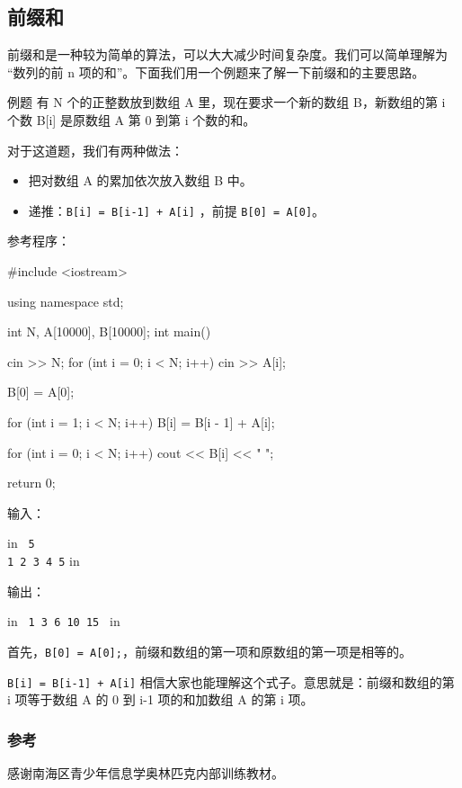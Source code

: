 
\subsection{前缀和}

前缀和是一种较为简单的算法，可以大大减少时间复杂度。我们可以简单理解为 “数列的前 n 项的和”。下面我们用一个例题来了解一下前缀和的主要思路。

\begin{NOTE}{例题}{}
有 N 个的正整数放到数组 A 里，现在要求一个新的数组 B，新数组的第 i 个数 B[i] 是原数组 A 第 0 到第 i 个数的和。
\end{NOTE}


对于这道题，我们有两种做法：

\begin{itemize}
\item 把对数组 A 的累加依次放入数组 B 中。
\item 递推：\texttt{B[i] = B[i-1] + A[i]} ，前提 \texttt{B[0] = A[0]}。
\end{itemize}

参考程序：

\begin{cppcode}
#include <iostream>

using namespace std;

int N, A[10000], B[10000];
int main() {
  cin >> N;
  for (int i = 0; i < N; i++) {
    cin >> A[i];
  }

  B[0] = A[0];

  for (int i = 1; i < N; i++) {
    B[i] = B[i - 1] + A[i];
  }

  for (int i = 0; i < N; i++) {
    cout << B[i] << " ";
  }

  return 0;
}
\end{cppcode}

输入：

 in
\texttt{
5\\1 2 3 4 5}
 in

输出：

 in
\texttt{
1 3 6 10 15 }
 in

首先，\texttt{B[0] = A[0];}，前缀和数组的第一项和原数组的第一项是相等的。

\texttt{B[i] = B[i-1] + A[i]} 相信大家也能理解这个式子。意思就是：前缀和数组的第 i 项等于数组 A 的 0 到 i-1 项的和加数组 A 的第 i 项。

\subsubsection{参考}

感谢南海区青少年信息学奥林匹克内部训练教材。

